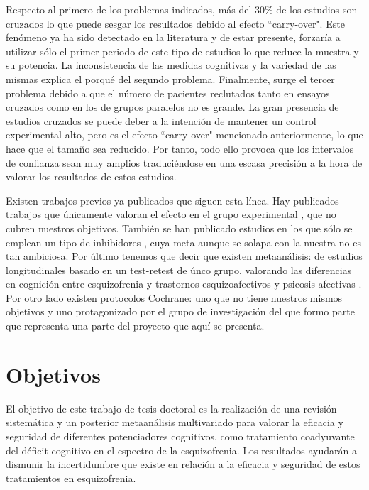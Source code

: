 \documentclass[a4paper,openright,12pt]{report}
\begin{document}
Respecto al primero de los problemas indicados, más del 30\% de los estudios son cruzados lo que puede sesgar los resultados debido al efecto ``carry-over". Este fenómeno ya ha sido detectado en la literatura \cite{Ballesteros2008} y de estar presente, forzaría a utilizar sólo el primer periodo de este tipo de estudios lo que reduce la muestra y su potencia. La inconsistencia de las medidas cognitivas y la variedad de las mismas explica el porqué del segundo problema. Finalmente, surge el tercer problema debido a que el número de pacientes reclutados tanto en ensayos cruzados como en los de grupos paralelos no es grande. La gran presencia de estudios cruzados se puede deber a la intención de mantener un control experimental alto, pero es el efecto ``carry-over" mencionado anteriormente, lo que hace que el tamaño sea reducido. Por tanto, todo ello provoca que los intervalos de confianza sean muy amplios traduciéndose en una escasa precisión a la hora de valorar los resultados de estos estudios.

Existen trabajos previos ya publicados que siguen esta línea. Hay publicados trabajos que únicamente valoran el efecto en el grupo experimental \cite{Chourinard2007}\cite{Stip2007}, que no cubren nuestros objetivos. También se han publicado estudios en los que sólo se emplean un tipo de inhibidores \cite{Ribeiz2010}, cuya meta aunque se solapa con la nuestra no es tan ambiciosa. Por último tenemos que decir que existen metaanálisis: de estudios longitudinales \cite{Szoke2008} basado en un test-retest de únco grupo, valorando las diferencias en cognición entre esquizofrenia y trastornos esquizoafectivos y psicosis afectivas \cite{Bora2009}. Por otro lado existen protocolos Cochrane: uno que no tiene nuestros mismos objetivos \cite{Singh2009} y uno protagonizado por el grupo de investigación del que formo parte que representa una parte del proyecto que aquí se presenta. 

\section{Objetivos}
El objetivo de este trabajo de tesis doctoral es la realización de una revisión sistemática y un posterior metaanálisis multivariado para valorar la eficacia y seguridad de diferentes potenciadores cognitivos, como tratamiento coadyuvante del déficit cognitivo en el espectro de la esquizofrenia. Los resultados ayudarán a dismunir la incertidumbre que existe en relación a la eficacia y seguridad de estos tratamientos en esquizofrenia.
\end{document}
